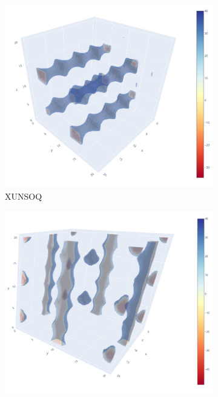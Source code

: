 \documentclass[main]{subfiles}
\begin{document}
\begin{figure}[ht]
  \centering
  \begin{subfigure}[b]{0.3\textwidth}
      \centering
      \includegraphics[width=\textwidth]{figures/5-diffusion/viz/XUNSOQ.jpg}
      \caption{XUNSOQ~\cite{Abrahams_2014}}\label{fgr:tube_cavities_a}
  \end{subfigure}
  \hfill
  \begin{subfigure}[b]{0.3\textwidth}
      \centering
      \includegraphics[width=\textwidth]{figures/5-diffusion/viz/BAEDTA01.jpg}

\end{subfigure}
\end{figure}
\end{document}
